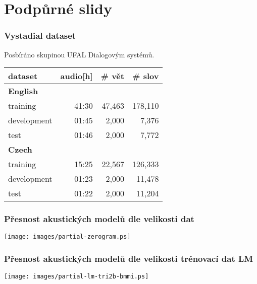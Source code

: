 \section{Podpůrné slidy} %

\begin{frame}\frametitle{Vystadial dataset} 
    \begin{center}
    Posbíráno skupinou UFAL Dialogovým systémů.\\
    \begin{tabular}{lrrr}
        \hline
        dataset & audio[h] & \# vět & \# slov \\
        \hline
        \textbf{English} & & & \\
                training & 41:30 & 47,463 & 178,110 \\
                development & 01:45 & 2,000 & 7,376 \\
                test & 01:46 & 2,000 & 7,772 \\
        \hline
        \textbf{Czech} & & & \\
                training & 15:25 & 22,567 & 126,333 \\
                development & 01:23 & 2,000 & 11,478 \\
                test & 01:22 & 2,000 & 11,204 \\
        \hline
		\end{tabular}
    \end{center}
\end{frame}


\begin{frame}\frametitle{Přesnost akustických modelů dle velikosti dat} 
    \begin{center}
        \texttt{[image: images/partial-zerogram.ps]}
    \end{center}
\end{frame}

\begin{frame}\frametitle{Přesnost akustických modelů dle velikosti trénovací dat LM} 
    \begin{center}
        \texttt{[image: images/partial-lm-tri2b-bmmi.ps]}
    \end{center}
\end{frame}

